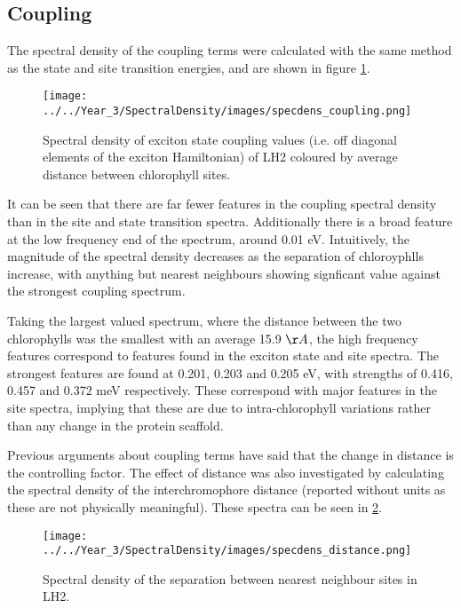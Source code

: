 \afterpartskip
\subsection{Coupling}
\label{subcsec:coupling}

The spectral density of the coupling terms were calculated with the same method
as the state and site transition energies, and are shown in figure \ref{fig:specdens_coupling}.

\begin{figure}
    \centering
    \texttt{[image: ../../Year\_3/SpectralDensity/images/specdens\_coupling.png]}
    \label{fig:specdens_coupling}
    \caption{Spectral density of exciton state coupling values (i.e. off diagonal
    elements of the exciton Hamiltonian) of LH2 coloured by average distance between 
    chlorophyll sites.}
\end{figure}

It can be seen that there are far fewer features in the coupling spectral density
than in the site and state transition spectra. Additionally there is a broad feature
at the low frequency end of the spectrum, around 0.01 eV. Intuitively, the magnitude
of the spectral density decreases as the separation of chloroyphlls increase, with
anything but nearest neighbours showing signficant value against the strongest coupling 
spectrum.

Taking the largest valued spectrum, where the distance between the two chlorophylls
was the smallest with an average 15.9 $\AA{}$, the high frequency features correspond 
to features found in the exciton state and site spectra. The strongest features are 
found at 0.201, 0.203 and 0.205 eV, with strengths of 0.416, 0.457 and 0.372 meV 
respectively. These correspond with major features in the site spectra, implying 
that these are due to intra-chlorophyll variations rather than any change in the
protein scaffold.

Previous arguments about coupling terms have said that the change in distance is
the controlling factor. The effect of distance was also investigated by calculating
the spectral density of the interchromophore distance (reported without units as 
these are not physically meaningful). These spectra can be seen in \ref{fig:specdens_distance}. 

\begin{figure}
    \centering
    \texttt{[image: ../../Year\_3/SpectralDensity/images/specdens\_distance.png]}
    \label{fig:specdens_distance}
    \caption{Spectral density of the separation between nearest neighbour sites
    in LH2.}
\end{figure}

